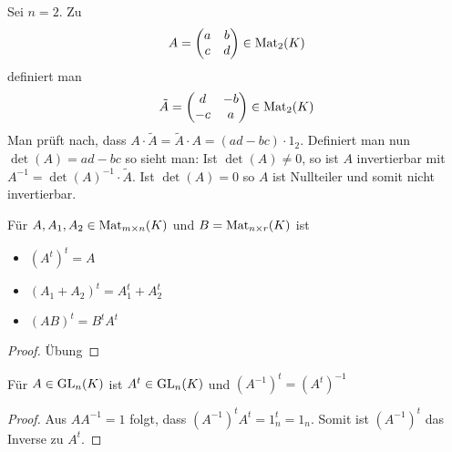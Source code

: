 \begin{example}
	Sei $n=2$. Zu
	\begin{align}
		A=\begin{pmatrix}a & b\\c & d\\\end{pmatrix} \in \operatorname{Mat}_2(K)\notag
	\end{align} 
	definiert man
	\begin{align}
		\tilde A=
		\begin{pmatrix}d & -b\\-c & a\\\end{pmatrix}\in \operatorname{Mat}_2(K)\notag
	\end{align}
	Man prüft nach, dass $A\cdot \tilde A=\tilde A\cdot A=
	(ad-bc)\cdot 1_2$. Definiert man nun $\det(A)=ad-bc$ so sieht man: Ist $\det(A)\neq 0$, so ist $A$ invertierbar mit 
	$A^{-1}=\det(A)^{-1}\cdot \tilde A$. Ist $\det(A)=0$ so $A$ ist Nullteiler und somit nicht invertierbar.
\end{example}

\begin{lemma}
	Für $A,A_1,A_2\in \operatorname{Mat}_{m\times n}(K)$ und $B=\operatorname{Mat}_{n\times r}(K)$ ist 
	\begin{itemize}
		\item $(A^t)^t=A$
		\item $(A_1+A_2)^t=A_1^t + A_2^t$
		\item $(AB)^t=B^tA^t$
	\end{itemize}
\end{lemma}
\begin{proof}
	Übung
\end{proof}

\begin{proposition}
	Für $A\in \operatorname{GL}_n(K)$ ist $A^t\in \operatorname{GL}_n(K)$ und $(A^{-1})^t = (A^t)^{-1}$
\end{proposition}
\begin{proof}
	Aus $AA^{-1}=1$ folgt, dass $(A^{-1})^tA^t=1_n^t=1_n$. Somit ist $(A^{-1})^t$ das Inverse zu $A^t$.
\end{proof}